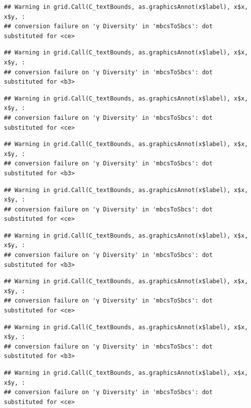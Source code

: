 \documentclass[
]{article}
\begin{document}
\begin{verbatim}
## Warning in grid.Call(C_textBounds, as.graphicsAnnot(x$label), x$x, x$y, :
## conversion failure on 'γ Diversity' in 'mbcsToSbcs': dot substituted for <ce>
\end{verbatim}

\begin{verbatim}
## Warning in grid.Call(C_textBounds, as.graphicsAnnot(x$label), x$x, x$y, :
## conversion failure on 'γ Diversity' in 'mbcsToSbcs': dot substituted for <b3>
\end{verbatim}

\begin{verbatim}
## Warning in grid.Call(C_textBounds, as.graphicsAnnot(x$label), x$x, x$y, :
## conversion failure on 'γ Diversity' in 'mbcsToSbcs': dot substituted for <ce>
\end{verbatim}

\begin{verbatim}
## Warning in grid.Call(C_textBounds, as.graphicsAnnot(x$label), x$x, x$y, :
## conversion failure on 'γ Diversity' in 'mbcsToSbcs': dot substituted for <b3>
\end{verbatim}

\begin{verbatim}
## Warning in grid.Call(C_textBounds, as.graphicsAnnot(x$label), x$x, x$y, :
## conversion failure on 'γ Diversity' in 'mbcsToSbcs': dot substituted for <ce>
\end{verbatim}

\begin{verbatim}
## Warning in grid.Call(C_textBounds, as.graphicsAnnot(x$label), x$x, x$y, :
## conversion failure on 'γ Diversity' in 'mbcsToSbcs': dot substituted for <b3>
\end{verbatim}

\begin{verbatim}
## Warning in grid.Call(C_textBounds, as.graphicsAnnot(x$label), x$x, x$y, :
## conversion failure on 'γ Diversity' in 'mbcsToSbcs': dot substituted for <ce>
\end{verbatim}

\begin{verbatim}
## Warning in grid.Call(C_textBounds, as.graphicsAnnot(x$label), x$x, x$y, :
## conversion failure on 'γ Diversity' in 'mbcsToSbcs': dot substituted for <b3>
\end{verbatim}

\begin{verbatim}
## Warning in grid.Call(C_textBounds, as.graphicsAnnot(x$label), x$x, x$y, :
## conversion failure on 'γ Diversity' in 'mbcsToSbcs': dot substituted for <ce>
\end{verbatim}
\end{document}
